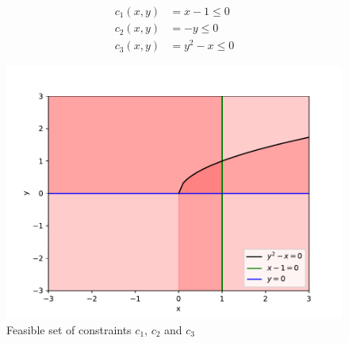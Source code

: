 $$
\begin{aligned}
    c_1(x,y) &= x-1 \leq 0 \\
    c_2(x,y) &= -y \leq 0\\
    c_3(x,y) &= y^2 - x \leq 0
\end{aligned}
$$
\begin{figure}[t]
    \label{fig:example22_set}
    \centering
    \includegraphics[page=1,width=.7\textwidth]{figs/solution_22.pdf} 
  \caption{Feasible set of constraints $c_1$, $c_2$ and $c_3$}
 \end{figure}


